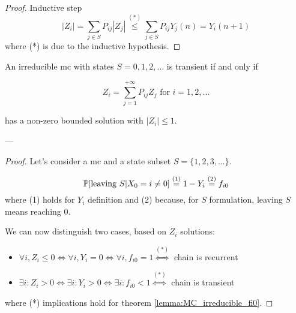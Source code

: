 	\begin{proof} Inductive step
		$$ |Z_i| = \sum_{j \in S} P_{ij} |Z_j| \stackrel{(*)}{\le} \sum_{j \in S} P_{ij} Y_j(n) = Y_i(n+1) $$
		where (*) is due to the inductive hypothesis.
	\end{proof}

	\begin{theorem}
		An irreducible \gls{mc} with states $S = 0, 1, 2, ...$ is transient if and only if

		$$ Z_i = \sum_{j=1}^{+\infty} P_{ij} Z_j \text{ for } i = 1, 2, ...$$

		has a non-zero bounded solution with $ |Z_i| \le 1$.
	\end{theorem}
	---
	\begin{proof}
		Let's consider a \gls{mc} and a state subset $S = \{1, 2, 3, ...\}$.

		$$ \mathbb{P}[\text{leaving } S| X_0 = i \neq 0] \stackrel{(1)}{=}
			1 - Y_i \stackrel{(2)}{=} f_{i0} $$
		where (1) holds for $Y_i$ definition and (2) because, for $S$ formulation, leaving $S$ means reaching 0.

		We can now distinguish two cases, based on $Z_i$ solutions:
		\begin{itemize}
			\item $ \forall i, Z_i \le 0 \Leftrightarrow \forall i, Y_i = 0 \Leftrightarrow \forall i, f_{i0} = 1 \stackrel{(*)}{\Leftrightarrow} $ chain is recurrent

			\item $ \exists i: Z_i > 0 \Leftrightarrow \exists i: Y_i > 0 \Leftrightarrow \exists i: f_{i0} < 1 \stackrel{(*)}{\Leftrightarrow} $ chain is transient
		\end{itemize}
		where (*) implications hold for theorem \ref{lemma:MC_irreducible_fi0}.
	\end{proof}

